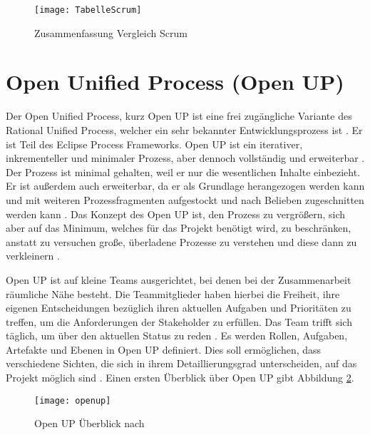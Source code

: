 \begin{figure}[htp]
\begin{center}
  \texttt{[image: TabelleScrum]} %
  \caption{Zusammenfassung Vergleich Scrum}
  \label{fig:TabelleScrum}
\end{center}
\end{figure}




\section{Open Unified Process (Open UP)}


Der Open Unified Process, kurz Open UP ist eine frei zugängliche Variante des Rational Unified Process, welcher ein sehr bekannter Entwicklungsprozess ist \cite{hauber2010}.  Er ist Teil des Eclipse Process Frameworks. Open UP ist ein iterativer, inkrementeller und minimaler Prozess, aber dennoch vollständig und erweiterbar \cite{Gau2006, Basem2010}. Der Prozess ist minimal gehalten, weil er nur die wesentlichen Inhalte einbezieht. Er ist außerdem auch erweiterbar, da er als Grundlage herangezogen werden kann und mit weiteren Prozessfragmenten aufgestockt und nach Belieben zugeschnitten werden kann \cite{Wang2007}. Das Konzept des Open UP ist, den Prozess zu vergrößern, sich aber auf das Minimum, welches für das Projekt benötigt wird, zu beschränken, anstatt zu versuchen große, überladene Prozesse zu verstehen und diese dann zu verkleinern \cite{ambler2012}.  \newline



Open UP ist auf kleine Teams ausgerichtet, bei denen bei der Zusammenarbeit räumliche Nähe besteht. Die Teammitglieder haben hierbei die Freiheit, ihre eigenen Entscheidungen bezüglich ihren aktuellen Aufgaben und Prioritäten zu treffen, um die Anforderungen der Stakeholder zu erfüllen. Das Team trifft sich täglich, um über den aktuellen Status zu reden \cite{OpenUPProcess}.\newline
Es werden Rollen, Aufgaben, Artefakte und Ebenen in Open UP definiert. Dies soll ermöglichen, dass verschiedene Sichten, die sich in ihrem Detaillierungsgrad unterscheiden, auf das Projekt möglich sind \cite{freudenreichevaluierung}. Einen ersten Überblick über Open UP gibt Abbildung \ref{fig:openup}.


\begin{figure}[htp]
\begin{center}
  \texttt{[image: openup]} %
  \caption{Open UP Überblick nach \cite{eclipseopenup}}
  \label{fig:openup}
\end{center}
\end{figure}

